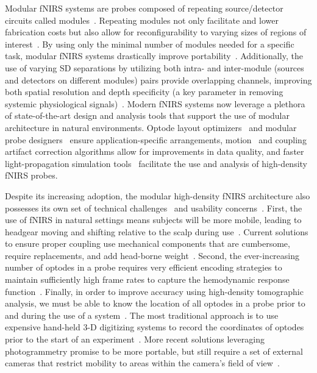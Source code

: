 Modular \ac{fNIRS} systems are probes composed of repeating source/detector circuits called modules~\cite{Chitnis2016}. Repeating modules not only facilitate and lower fabrication costs but also allow for reconfigurability to varying sizes of regions of interest~\cite{Zhao2017}. By using only the minimal number of modules needed for a specific task, modular \ac{fNIRS} systems drastically improve portability~\cite{Yucel2017}. Additionally, the use of varying \ac{SD} separations by utilizing both intra- and inter-module (sources and detectors on different modules) pairs provide overlapping channels, improving both spatial resolution and depth specificity (a key parameter in removing systemic physiological signals)~\cite{Gregg2010, VidalRosas2021}. Modern \ac{fNIRS} systems now leverage a plethora of state-of-the-art design and analysis tools that support the use of modular architecture in natural environments. Optode layout optimizers~\cite{Machado2018, Aasted2015, ZimeoMorais2018, Brigadoi2018} and modular probe designers~\cite{Vanegas2022} ensure application-specific arrangements, motion~\cite{Huppert2009, Santosa2018} and coupling~\cite{Hernandez2020} artifact correction algorithms allow for improvements in data quality, and faster light-propagation simulation tools~\cite{Nirfast,Fang2009} facilitate the use and analysis of high-density \ac{fNIRS} probes. 

Despite its increasing adoption, the modular high-density \ac{fNIRS} architecture also possesses its own set of technical challenges~\cite{Pinti2018, Herold2017} and usability concerns~\cite{Moon2019, Hasan2022}. First, the use of \ac{fNIRS} in natural settings means subjects will be more mobile, leading to headgear moving and shifting relative to the scalp during use~\cite{Herold2017, Perrey2014}. Current solutions to ensure proper coupling use mechanical components that are cumbersome, require replacements, and add head-borne weight~\cite{Bartkowski2019, Bci2017}. Second, the ever-increasing number of optodes in a probe requires very efficient encoding strategies to maintain sufficiently high frame rates to capture the hemodynamic response function~\cite{Maki1995, Everdell2005, Alper2022}. Finally, in order to improve accuracy using high-density tomographic analysis, we must be able to know the location of all optodes in a probe prior to and during the use of a system~\cite{Mazzonetto2022}. The most traditional approach is to use expensive hand-held 3-D digitizing systems to record the coordinates of optodes prior to the start of an experiment~\cite{Pinti2018, Zhao2020}. More recent solutions leveraging photogrammetry promise to be more portable, but still require a set of external cameras that restrict mobility to areas within the camera's field of view~\cite{VidalRosas2021, Mazzonetto2022}. 

